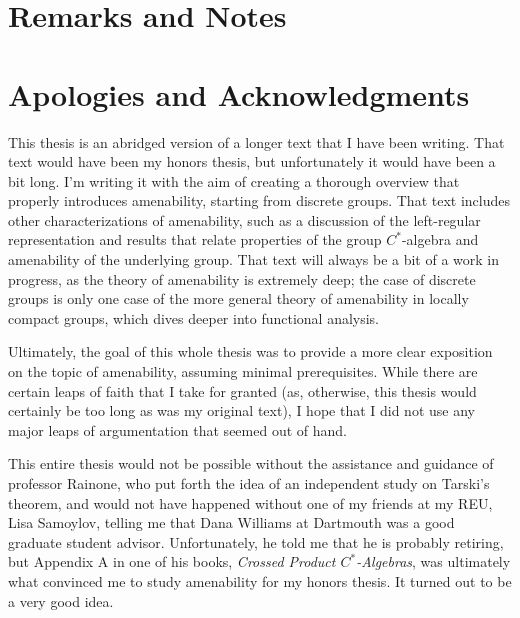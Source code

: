 \documentclass[10pt]{mypackage2}
\begin{document}
\section{Remarks and Notes}%
\section{Apologies and Acknowledgments}%
This thesis is an abridged version of a longer text that I have been writing. That text would have been my honors thesis, but unfortunately it would have been a bit long. I'm writing it with the aim of creating a thorough overview that properly introduces amenability, starting from discrete groups. That text includes other characterizations of amenability, such as a discussion of the left-regular representation and results that relate properties of the group $C^{\ast}$-algebra and amenability of the underlying group. That text will always be a bit of a work in progress, as the theory of amenability is extremely deep; the case of discrete groups is only one case of the more general theory of amenability in locally compact groups, which dives deeper into functional analysis.\newline

Ultimately, the goal of this whole thesis was to provide a more clear exposition on the topic of amenability, assuming minimal prerequisites. While there are certain leaps of faith that I take for granted (as, otherwise, this thesis would certainly be too long as was my original text), I hope that I did not use any major leaps of argumentation that seemed out of hand.\newline

This entire thesis would not be possible without the assistance and guidance of professor Rainone, who put forth the idea of an independent study on Tarski's theorem, and would not have happened without one of my friends at my REU, Lisa Samoylov, telling me that Dana Williams at Dartmouth was a good graduate student advisor. Unfortunately, he told me that he is probably retiring, but Appendix A in one of his books, \textit{Crossed Product $C^{\ast}$-Algebras}, was ultimately what convinced me to study amenability for my honors thesis. It turned out to be a very good idea.
\nocite{*}
\printbibliography[title={References}]
\end{document}
